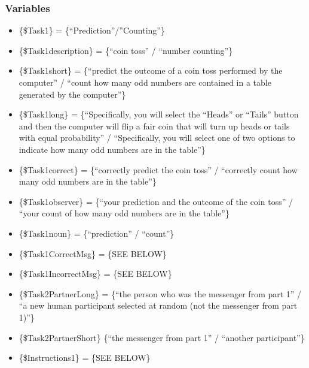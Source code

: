 \subsubsection*{Variables}
\begin{itemize}
\item \{\$Task1\} = \{``Prediction''/''Counting''\} 
\item \{\$Task1description\} = \{``coin toss''
/ ``number counting''\} 
\item \{\$Task1short\} = \{``predict the outcome of a coin toss
performed by the computer'' / ``count how many odd numbers are contained in a
table generated by the computer''\} 
\item \{\$Task1long\} = \{``Specifically, you will
select the ``Heads'' or ``Tails'' button and then the computer will flip a fair
coin that will turn up heads or tails with equal probability'' / ``Specifically,
you will select one of two options to indicate how many odd numbers are in the
table''\} 
\item \{\$Task1correct\} = \{``correctly predict the coin toss'' / ``correctly
count how many odd numbers are in the table''\} 
\item \{\$Task1observer\} = \{``your
prediction and the outcome of the coin toss'' / ``your count of how many odd
numbers are in the table''\} 
\item \{\$Task1noun\} = \{``prediction'' / ``count''\}
\item \{\$Task1CorrectMsg\} = \{SEE BELOW\}
\item \{\$Task1IncorrectMsg\} = \{SEE BELOW\} 
\item \{\$Task2PartnerLong\} = \{``the
person who was the messenger from part 1'' / ``a new human participant selected
at random (not the messenger from part 1)''\} 
\item \{\$Task2PartnerShort\} \{``the
messenger from part 1'' / ``another participant''\} 
\item \{\$Instructions1\} = \{SEE
BELOW\}
\end{itemize}

